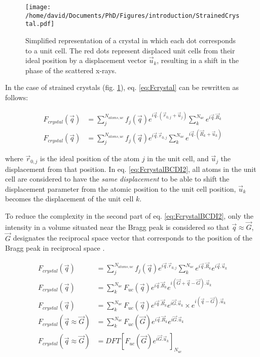 \begin{figure}[!htb]
    \centering
    \texttt{[image: /home/david/Documents/PhD/Figures/introduction/StrainedCrystal.pdf]}
    \caption{
    Simplified representation of a crystal in which each dot corresponds to a unit cell.
    The red dots represent displaced unit cells from their ideal position by a displacement vector $\vec{u}_k$, resulting in a shift in the phase of the scattered x-rays.
    }
    \label{fig:StrainedCrystals}
\end{figure}

In the case of strained crystals (fig. \ref{fig:StrainedCrystals}), eq. \ref{eq:Fcrystal} can be rewritten as follows:

\begin{align}
    \label{eq:FcrystalBCDI1}
    F_{crystal}(\vec{q}) & = \sum_j^{N_{atoms, uc}} f_j(\vec{q}) e^{i\vec{q}.(\vec{r}_{0,j} + \vec{u}_{j})} \sum_k^{N_{uc}} e^{i\vec{q}.\vec{R}_k}\\
    \label{eq:FcrystalBCDI2}
    F_{crystal}(\vec{q}) & = \sum_j^{N_{atoms, uc}} f_j(\vec{q}) e^{i\vec{q}.\vec{r}_{0,j}} \sum_k^{N_{uc}} e^{i\vec{q}.(\vec{R}_k + \vec{u}_{k})}
\end{align}

where $\vec{r}_{0,j}$ is the ideal position of the atom $j$ in the unit cell, and $\vec{u}_{j}$ the displacement from that position.
In eq. \ref{eq:FcrystalBCDI2}, all atoms in the unit cell are considered to have the \textit{same displacement} to be able to shift the displacement parameter from the atomic position to the unit cell position, $\vec{u}_{k}$ becomes the displacement of the unit cell $k$.

To reduce the complexity in the second part of eq. \ref{eq:FcrystalBCDI2}, only the intensity in a volume situated near the Bragg peak is considered so that $\vec{q} \approx \vec{G}$, $\vec{G}$ designates the reciprocal space vector that corresponds to the position of the Bragg peak in reciprocal space \parencite{Pfeifer2006, Minkevich2007, Harder2007}.

\begin{align}
    \label{eq:FcrystalBCDI3}
    F_{crystal}(\vec{q}) & = \sum_j^{N_{atoms, uc}} f_j(\vec{q}) e^{i\vec{q}.\vec{r}_{0,j}} \sum_k^{N_{uc}} e^{i\vec{q}.\vec{R}_k} e^{i\vec{q}.\vec{u}_k}\\
    \label{eq:FcrystalBCDI4}
    F_{crystal}(\vec{q}) & = \sum_k^{N_{uc}} F_{uc}(\vec{q}) e^{i\vec{q}.\vec{R}_k} e^{i(\vec{G}+\vec{q}-\vec{G}).\vec{u}_k}\\
    \label{eq:FcrystalBCDI5}
    F_{crystal}(\vec{q}) & = \sum_k^{N_{uc}} F_{uc}(\vec{q}) e^{i\vec{q}.\vec{R}_k} e^{i\vec{G}.\vec{u}_k} \times e^{i(\vec{q}-\vec{G}).\vec{u}_k}\\
    \label{eq:FcrystalBCDI6}
    F_{crystal}(\vec{q} \approx \vec{G}) & = \sum_k^{N_{uc}} F_{uc}(\vec{G}) e^{i\vec{q}.\vec{R}_k} e^{i\vec{G}.\vec{u}_k}\\
    \label{eq:FcrystalBCDI7}
    F_{crystal}(\vec{q} \approx \vec{G}) & = DFT[ F_{uc}(\vec{G}) e^{i\vec{G}.\vec{u}_k}]_{N_{uc}}
\end{align}


